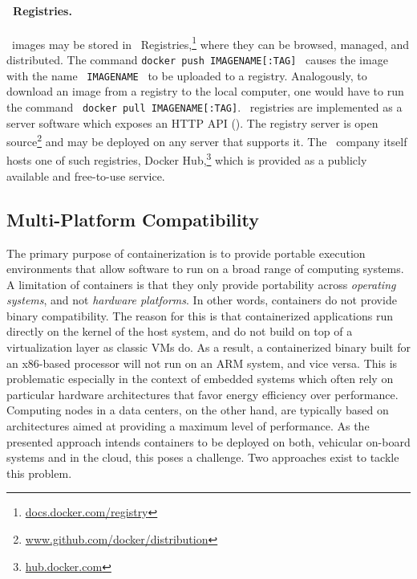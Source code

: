 \paragraph{\docker\ Registries.}
\docker\ images may be stored in \docker\ Registries,\footnote{\url{docs.docker.com/registry}} where they can be browsed, managed, and distributed. The command \linebreak \texttt{docker push IMAGENAME[:TAG]} \ causes the image with the name \ \mbox{\texttt{IMAGENAME}} \ to be uploaded to a registry. Analogously, to download an image from a registry to the local computer, one would have to run the command \ \mbox{\texttt{docker pull IMAGENAME[:TAG]}}. \docker\ registries are implemented as a server software which exposes an HTTP API (\cf {}). The registry server is open source\footnote{\url{www.github.com/docker/distribution}} and may be deployed on any server that supports it. The \docker\ company itself hosts one of such registries, Docker Hub,\footnote{\url{hub.docker.com}} which is provided as a publicly available  and free-to-use service.
\pagebreak
\subsection{Multi-Platform Compatibility} \label{sec:multiplat}
The primary purpose of containerization is to provide portable execution environments that allow software to run on a broad range of computing systems. A limitation of containers is that they only provide portability across \emph{operating systems}, and not \emph{hardware platforms}. In other words, containers do not provide binary compatibility. The reason for this is that containerized applications run directly on the kernel of the host system, and do not build on top of a virtualization layer as classic VMs do. As a result, a containerized binary built for an x86-based processor will not run on an ARM system, and vice versa. This is problematic especially in the context of embedded systems which often rely on particular hardware architectures that favor energy efficiency over performance. Computing nodes in a data centers, on the other hand, are typically based on architectures aimed at providing a maximum level of performance. As the presented approach intends containers to be deployed on both, vehicular on-board systems and in the cloud, this poses a challenge. Two approaches exist to tackle this problem.

